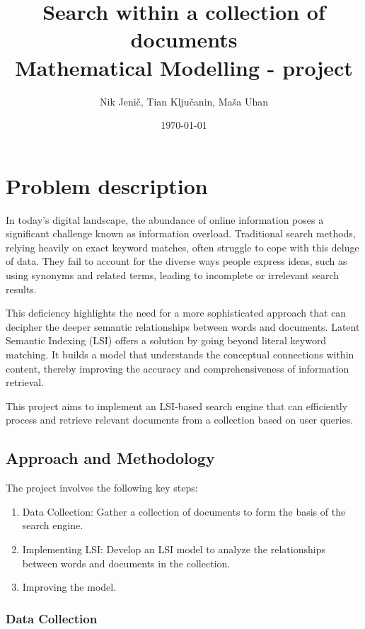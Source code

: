 \documentclass[12pt,a4paper]{article}
\title{Search within a collection of documents\\
\normalsize{Mathematical Modelling - project}
}
\author{Nik Jenič, Tian Ključanin, Maša Uhan}
\date{\today}
\begin{document}
\maketitle
\newpage
\tableofcontents

\newpage
\section{Problem description}

In today's digital landscape, the abundance of online information poses a significant challenge known as information overload. Traditional search methods, relying heavily on exact keyword matches, often struggle to cope with this deluge of data. They fail to account for the diverse ways people express ideas, such as using synonyms and related terms, leading to incomplete or irrelevant search results.

\bigskip
\noindent This deficiency highlights the need for a more sophisticated approach that can decipher the deeper semantic relationships between words and documents. Latent Semantic Indexing (LSI) offers a solution by going beyond literal keyword matching. It builds a model that understands the conceptual connections within content, thereby improving the accuracy and comprehensiveness of information retrieval.

\bigskip
\noindent This project aims to implement an LSI-based search engine that can efficiently process and retrieve relevant documents from a collection based on user queries. 


\subsection{Approach and Methodology}

The project involves the following key steps:

\begin{enumerate}
    \item Data Collection: Gather a collection of documents to form the basis of the search engine.
    \item Implementing LSI: Develop an LSI model to analyze the relationships between words and documents in the collection.
    \item Improving the model.
\end{enumerate}


\subsubsection{Data Collection}
\end{document}
